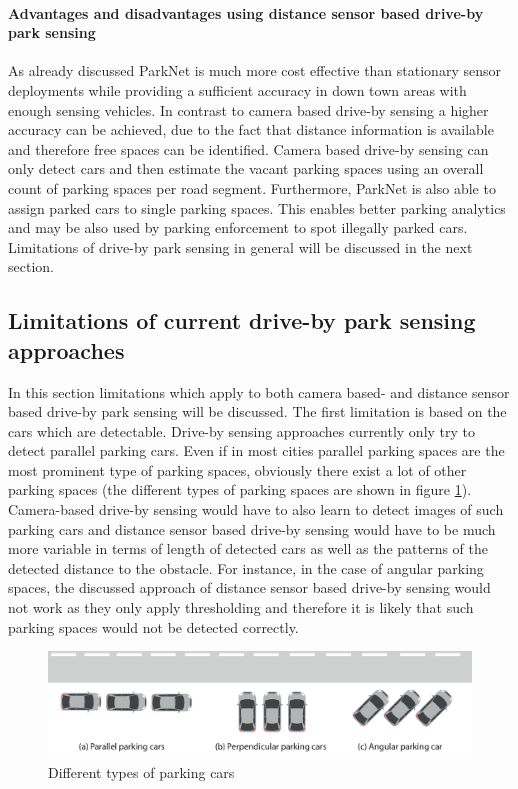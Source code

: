\paragraph{Advantages and disadvantages using distance sensor based drive-by park sensing}

As already discussed ParkNet is much more cost effective than stationary sensor deployments while providing a sufficient accuracy in down town areas with enough sensing vehicles. In contrast to camera based drive-by sensing a higher accuracy can be achieved, due to the fact that distance information is available and therefore free spaces can be identified. Camera based drive-by sensing can only detect cars and then estimate the vacant parking spaces using an overall count of parking spaces per road segment. Furthermore, ParkNet is also able to assign parked cars to single parking spaces. This enables better parking analytics and may be also used by parking enforcement to spot illegally parked cars. Limitations of drive-by park sensing in general will be discussed in the next section.


\subsection{Limitations of current drive-by park sensing approaches}
\label{sec:limitations_driveby_sensing}

In this section limitations which apply to both camera based- and distance sensor based drive-by park sensing will be discussed.
The first limitation is based on the cars which are detectable. Drive-by sensing approaches currently only try to detect parallel parking cars. Even if in most cities parallel parking spaces are the most prominent type of parking spaces, obviously there exist a lot of other parking spaces (the different types of parking spaces are shown in figure \ref{fig:types_of_parking_cars}). Camera-based drive-by sensing would have to also learn to detect images of such parking cars and distance sensor based drive-by sensing would have to be much more variable in terms of length of detected cars as well as the patterns of the detected distance to the obstacle. For instance, in the case of angular parking spaces, the discussed approach of distance sensor based drive-by sensing would not work as they only apply thresholding and therefore it is likely that such parking spaces would not be detected correctly.

\begin{figure}
	\centering
	\includegraphics[width=\textwidth]{img/types-of-parking-cars.eps}
	\caption{Different types of parking cars}
	\label{fig:types_of_parking_cars}
\end{figure}

